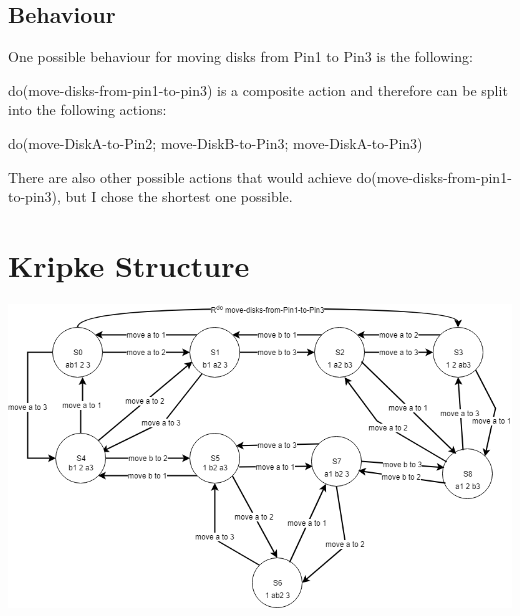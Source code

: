 \documentclass[a4paper]{article}
\begin{document}
\newpage
\subsection{Behaviour}
One possible behaviour for moving disks from Pin1 to Pin3 is the following:

do(move-disks-from-pin1-to-pin3) is a composite action and therefore can be split into the following actions:

do(move-DiskA-to-Pin2; move-DiskB-to-Pin3; move-DiskA-to-Pin3)

\noindent
There are also other possible actions that would achieve do(move-disks-from-pin1-to-pin3), but I chose the shortest one possible.


\section{Kripke Structure}
\includegraphics[scale=0.45]{"Hanoi Dynamic Logic"}
\end{document}
